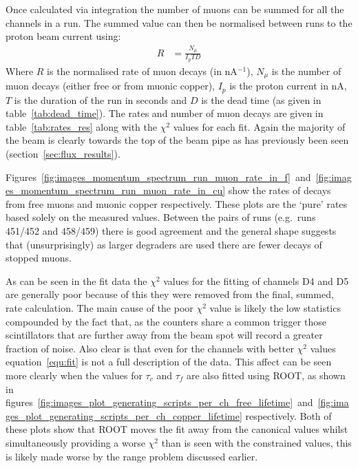 \clearpage

Once calculated via integration the number of muons can be summed for all the channels in a run. The summed value can then be normalised between runs to the proton beam current using:
\begin{align}
  R &= \frac{N_{\mu}}{I_p T D} \label{equ:rate}
\end{align}
Where \( R \) is the normalised rate of muon decays (in nA\(^{-1}\)), \(N_{\mu}\) is the number of muon decays (either free or from muonic copper), \( I_p \) is the proton current in nA, \( T \) is the duration of the run in seconds and \( D \) is the dead time (as given in table~\ref{tab:dead_time}). The rates and number of muon decays are given in table~\ref{tab:rates_res} along with the \(\chi^2\) values for each fit. Again the majority of the beam is clearly towards the top of the beam pipe as has previously been seen (section~\ref{sec:flux_results}).

Figures~\ref{fig:images_momentum_spectrum_run_muon_rate_in_f}~and~\ref{fig:images_momentum_spectrum_run_muon_rate_in_cu} show the rates of decays from free muons and muonic copper respectively. These plots are the `pure' rates based solely on the measured values. Between the pairs of runs (e.g.\ runs 451/452 and 458/459) there is good agreement and the general shape suggests that (unsurprisingly) as larger degraders are used there are fewer decays of stopped muons. 


As can be seen in the fit data the \(\chi^2\) values for the fitting of channels D4 and D5 are generally poor because of this they were removed from the final, summed, rate calculation. The main cause of the poor \(\chi^2\) value is likely the low statistics compounded by the fact that, as the counters share a common trigger those scintillators that are further away from the beam spot will record a greater fraction of noise. Also clear is that even for the channels with better \(\chi^2\) values equation~\eqref{equ:fit} is not a full description of the data. This affect can be seen more clearly when the values for \( \tau_c \) and \( \tau_f \) are also fitted using ROOT, as shown in figures~\ref{fig:images_plot_generating_scripts_per_ch_free_lifetime}~and~\ref{fig:images_plot_generating_scripts_per_ch_copper_lifetime} respectively. Both of these plots show that ROOT moves the fit away from the canonical values whilst simultaneously providing a worse \(\chi^2\) than is seen with the constrained values, this is likely made worse by the range problem discussed earlier.

